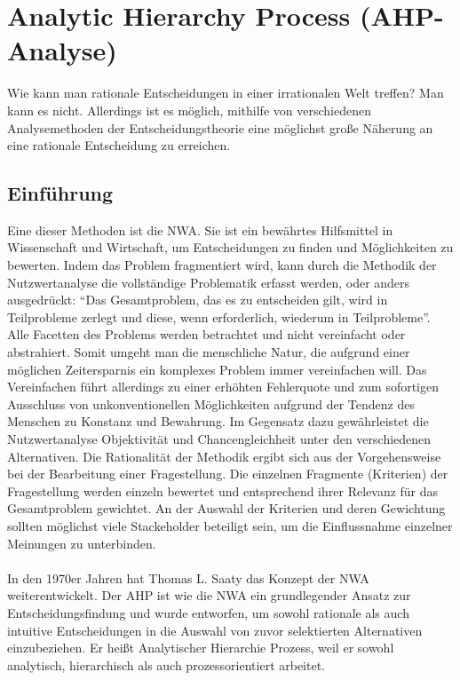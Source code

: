 \section{Analytic Hierarchy Process (AHP-Analyse)}\label{ahp}
Wie kann man rationale Entscheidungen in einer irrationalen Welt treffen? Man kann es nicht. Allerdings ist es möglich, mithilfe von verschiedenen Analysemethoden der Entscheidungstheorie eine möglichst große Näherung an eine rationale Entscheidung zu erreichen. 
\subsection{Einführung}
Eine dieser Methoden ist die \ac{NWA}. Sie ist ein bewährtes Hilfsmittel in Wissenschaft und Wirtschaft, um Entscheidungen zu finden und Möglichkeiten zu bewerten. Indem das Problem fragmentiert wird, kann durch die Methodik der Nutzwertanalyse die vollständige Problematik erfasst werden, oder anders ausgedrückt: \enquote{Das Gesamtproblem, das es zu entscheiden gilt, wird in Teilprobleme zerlegt und diese, wenn erforderlich, wiederum in Teilprobleme}\autocite[S.1]{Kuehnapfel.2014}. Alle Facetten des Problems werden betrachtet und nicht vereinfacht oder abstrahiert. Somit umgeht man die menschliche Natur, die aufgrund einer möglichen Zeitersparnis ein komplexes Problem immer vereinfachen will. Das Vereinfachen führt allerdings zu einer erhöhten Fehlerquote und zum sofortigen Ausschluss von unkonventionellen Möglichkeiten aufgrund der Tendenz des Menschen zu Konstanz und Bewahrung\autocite[Vgl.][S.1]{Kuehnapfel.2014}. Im Gegensatz dazu gewährleistet die Nutzwertanalyse Objektivität und Chancengleichheit unter den verschiedenen Alternativen.\newline
Die Rationalität der Methodik ergibt sich aus der Vorgehensweise bei der Bearbeitung einer Fragestellung. Die einzelnen Fragmente (Kriterien) der Fragestellung werden einzeln bewertet und entsprechend ihrer Relevanz für das Gesamtproblem gewichtet.\autocite[Vgl.][S.10]{Kuehnapfel.2014} An der Auswahl der Kriterien und deren Gewichtung sollten möglichst viele Stackeholder beteiligt sein, um die Einflussnahme einzelner Meinungen zu unterbinden.\\
\\
In den 1970er Jahren hat Thomas L. Saaty das Konzept der \ac{NWA} weiterentwickelt. Der \ac{AHP} ist wie die \ac{NWA} ein grundlegender Ansatz zur Entscheidungsfindung und wurde entworfen, um sowohl rationale als auch intuitive Entscheidungen in die Auswahl von zuvor selektierten Alternativen einzubeziehen.\autocite[Vgl.][S.1]{Saaty.2012} Er heißt Analytischer Hierarchie Prozess, weil er sowohl analytisch, hierarchisch als auch prozessorientiert arbeitet.\autocite{TUM.2015}
